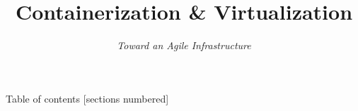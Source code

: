 \documentclass[
    handout, %
    aspectratio=169
]{beamer}
\title[Containerization \& Virtualization]{Containerization \& Virtualization}
\subtitle{\textit{Toward an Agile Infrastructure}}
\begin{document}
    \maketitle

    \begin{frame}{Table of contents}
        [sections numbered]
        \tableofcontents[hideallsubsections]
    \end{frame}

    
    
    
    
    
\end{document}

